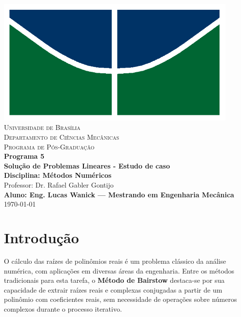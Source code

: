 \documentclass[12pt]{article}
\begin{document}
\begin{titlepage}
    \centering
    \includegraphics[width=12cm]{img/unb_bandeira.png} \\
    \vspace{1cm}
    \textsc{\Large Universidade de Bras\'ilia} \\
    \textsc{Departamento de Ciências Mec\^anicas} \\
    \textsc{Programa de P\'os-Gradua\c{c}\~ao} \\
    \vfill
    {\Large\bfseries Programa 5} \\
    \vspace{0.5cm}
    {\Large\bfseries Solução de Problemas Lineares - Estudo de caso} \\
    \vspace{0.5cm}
    \textbf{Disciplina: M\'etodos Num\'ericos} \\
    Professor: Dr. Rafael Gabler Gontijo \\
    \vfill
    \textbf{Aluno: Eng. Lucas Wanick — Mestrando em Engenharia Mec\^anica} \\
    \vspace{0.5cm}
        \today \\
\end{titlepage}


\section{Introdução}
O cálculo das raízes de polinômios reais é um problema clássico da análise numérica, com aplicações em diversas áreas da engenharia. Entre os métodos tradicionais para esta tarefa, o \textbf{Método de Bairstow} destaca-se por sua capacidade de extrair raízes reais e complexas conjugadas a partir de um polinômio com coeficientes reais, sem necessidade de operações sobre números complexos durante o processo iterativo.
\end{document}

